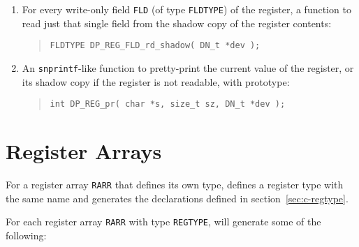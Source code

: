 \documentclass[a4paper,11pt,twoside]{report}
\begin{document}
\begin{enumerate}
\item For every write-only field \texttt{FLD} (of type \texttt{FLDTYPE})
  of the register, a function to read just that single field from the
  shadow copy of the register contents: 
  \begin{quote}
    \texttt{FLDTYPE DP\_REG\_FLD\_rd\_shadow( DN\_t *dev );}
  \end{quote}
  
\item An \texttt{snprintf}-like function to pretty-print the
  current value of the register, or its shadow copy if the register is
  not readable, with prototype:
  \begin{quote}
    \texttt{int DP\_REG\_pr( char *s, size\_t sz, DN\_t *dev );}
  \end{quote}

\end{enumerate}

\section{Register Arrays}\label{sec:c-regarray}

For a register array \texttt{RARR} that defines its own type, \Mac defines
a register type with the same name and generates the declarations
defined in section~\ref{sec:c-regtype}. 

For each register array \texttt{RARR} with type \texttt{REGTYPE}, \Mac will
generate some of the following:
\end{document}

